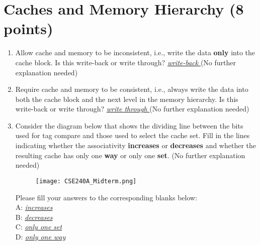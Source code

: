 \documentclass{article}
\begin{document}
\section{Caches and Memory Hierarchy (8 points)}
\begin{enumerate}[label=\Alph*]
    \item Allow cache and memory to be inconsistent, i.e., write the data \textbf{only} into the cache block. Is this write-back or write through? \ul{\textit{ write-back }} (No further explanation needed)
    
    \item Require cache and memory to be consistent, i.e., always write the data into both the cache block and the next level in the memory hierarchy. Is this write-back or write through? \ul{\textit{write through }} (No further explanation needed)
    
    \item Consider the diagram below that shows the dividing line between the bits used for tag compare and those used to select the cache set. Fill in the lines indicating whether the associativity \textbf{increases} or \textbf{decreases} and whether the resulting cache has only one \textbf{way} or only one \textbf{set}. (No further explanation needed)
    \begin{figure}[!h]
        \centering
        \texttt{[image: CSE240A\_Midterm.png]}
    \end{figure}
    
    Please fill your answers to the corresponding blanks below:\\
    A: \ul{\textit{increases}}\\
    B: \ul{\textit{decreases}}\\
    C: \ul{\textit{only one set}}\\
    D: \ul{\textit{only one way}}\\
\end{enumerate}
\end{document}
